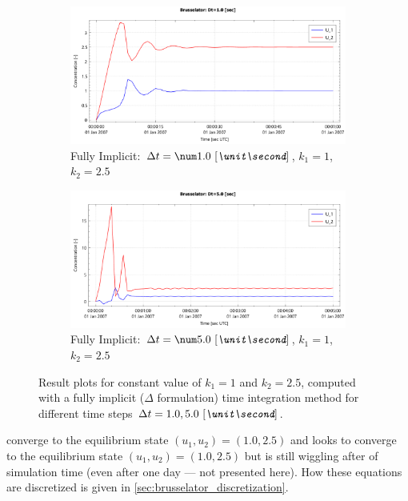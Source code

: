 \begin{figure}[H]
    \begin{subfigure}{0.5\textwidth}
        \includegraphics[width=\textwidth]{figures/brusselator_imp_dt=1d00.pdf}
        \caption{Fully Implicit: $\Dt=\bqty{1.0}{\second}$, $k_1=1$, $k_2=2.5$}\label{fig:imp_dt=1d00}
    \end{subfigure}
    \begin{subfigure}{0.5\textwidth}
        \includegraphics[width=\textwidth]{figures/brusselator_imp_dt=5d00.pdf}
        \caption{Fully Implicit: $\Dt=\bqty{5.0}{\second}$, $k_1=1$, $k_2=2.5$}\label{fig:imp_dt=5d00}
    \end{subfigure}
    \caption[Brusselator experiment: $\Dt = 1.0, 5.0\ \bunit{\second}$]{Result plots for constant value of $k_1 = 1$ and $k_2 =2.5$, computed with a fully implicit ($\Delta$ formulation) time integration method for different time steps $\Dt = 1.0, 5.0\ \bunit{\second}$.
    }
\end{figure}
 converge to the equilibrium state $(u_1, u_2) = (1.0, 2.5)$ and
 looks to converge to the equilibrium state $(u_1, u_2) = (1.0, 2.5)$ but is still wiggling after  of simulation time (even after one day --- not presented here).
How these equations are discretized is given in \autoref{sec:brusselator_discretization}.

